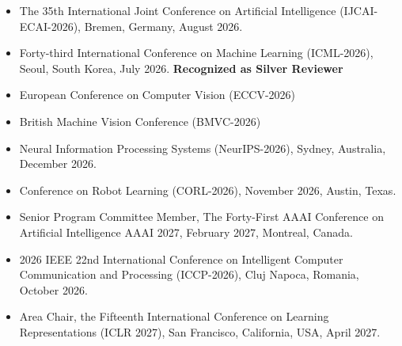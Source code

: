 \begin{itemize}
\item  The 35th International Joint Conference on Artificial Intelligence (IJCAI-ECAI-2026), Bremen, Germany, August 2026. 

\item Forty-third International Conference on Machine Learning (ICML-2026), Seoul, South Korea, July 2026. \textbf{Recognized as Silver Reviewer}

\item European Conference on Computer Vision (ECCV-2026)

\item British Machine Vision Conference (BMVC-2026)

\item Neural Information Processing Systems (NeurIPS-2026), Sydney, Australia, December 2026.

\item Conference on Robot Learning (CORL-2026), November 2026, Austin, Texas.

\item Senior Program Committee Member, The Forty-First AAAI Conference on Artificial Intelligence AAAI 2027, February 2027, Montreal, Canada.

\item 2026 IEEE 22nd International Conference on Intelligent Computer Communication and Processing (ICCP-2026), Cluj Napoca, Romania, October 2026.

\item Area Chair, the Fifteenth International Conference on Learning Representations (ICLR 2027), San Francisco, California, USA, April 2027.

\end{itemize}


